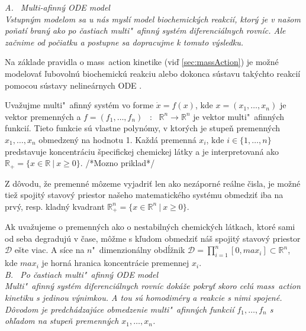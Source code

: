 \documentclass[11pt,final,oneside]{fithesis}
\begin{document}
\noindent
\it A. \ Multi-afinn\'y ODE model\rm
\\

Vstupn\'ym modelom sa u n\'as mysl\'i model biochemick\'ych reakci\'i, ktor\'y je v na\v som po\v nat\'i bran\'y ako po \v castiach 
multi"~afinn\'y syst\'em diferenci\'alnych rovn\'ic. Ale za\v cnime od po\v ciatku a postupne sa dopracujme k tomuto v\'ysledku.

Na z\'aklade pravidla o mass~action kinetike (vi\v d \ref{sec:massAction}) je mo\v zn\'e modelova\v t \v lubovoln\'u biochemick\'u reakciu alebo dokonca 
s\'ustavu tak\'ychto reakci\'i pomocou s\'ustavy neline\'arnych ODE \cite{ODE}.

Uva\v zujme multi"~afinn\'y syst\'em vo forme $\dot{x} = f(x)$, kde $x = (x_1,\dots{},x_n)$ je vektor premenn\'ych a $f = (f_1,\dots{},f_n)$ \ : \ 
$\mathbb{R}^n \rightarrow \mathbb{R}^n$ je vektor multi"~afin\-n\'ych funkci\'i. Tieto funkcie s\'u vlastne polyn\'omy, v ktor\'ych je stupe\v n premenn\'ych 
$x_1,\dots{},x_n$ obmedzen\'y na hodnotu 1. Ka\v zd\'a premenn\'a $x_i$, kde $i \in \{1,\dots{},n\}$ predstavuje koncentr\'aciu \v specifickej chemickej l\'atky a je interpretovan\'a ako
{$\mathbb{R}_+ = \lbrace{}  x \in \mathbb{R}\ |\ {}x \geq 0  \rbrace$}. /*Mozno priklad*/

Z d\^ ovodu, \v ze premenn\'e m\^ ozeme vyjadri\v t len ako nez\'aporn\'e re\'alne \v cisla, je mo\v zn\'e tie\v z spojit\'y stavov\'y priestor na\v seho 
matematick\'eho syst\'emu obmedzi\v t iba na prv\'y, resp. kladn\'y kvadrant {$\mathbb{R}_+^n = \lbrace{}  x \in \mathbb{R}^n\ |\ {}x \geq 0  \rbrace$}.

Ak uva\v zujeme o premenn\'ych ako o nestabiln\'ych chemick\'ych l\'atkach, ktor\'e sami od seba degraduj\'u v \v case, m\^ o\v zme s k\v ludom obmedzi\v t 
n\'a\v s spojit\'y stavov\'y priestor $\mathcal{D}$ e\v ste viac. A s\'ice na $n$"~dimenzion\'alny obd\'l\v znik $\mathcal{D} = \prod_{i=1}^n[0,max_i] 
\subset \mathbb{R}^n$, kde $max_i$ je horn\'a hranica koncentr\'acie pre\-men\-nej $x_i$.
\cite{HIBI-2009}\cite{HIBI-2010}
\\

\noindent
\it B. \ Po \v castiach multi"~afinn\'y ODE model\rm
\\

Multi"~afinn\'y syst\'em diferenci\'alnych rovn\'ic dok\'a\v ze pokry\v t skoro cel\'u mass~action kinetiku s jedinou v\'ynimkou. A tou s\'u 
homodim\'ery a reakcie s nimi spojen\'e. D\^ ovodom je predch\'adzaj\'uce obmedzenie multi"~afinn\'ych funkci\'i $f_1,\dots{},f_n$ s oh\v ladom 
na stupe\v n premenn\'ych $x_1,\dots{},x_n$.
\end{document}
